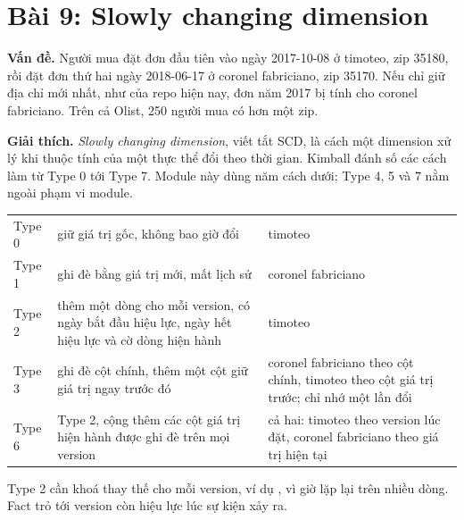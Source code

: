 \section{Bài 9: Slowly changing dimension}

\textbf{Vấn đề.} Người mua  đặt đơn đầu tiên vào ngày 2017-10-08 ở timoteo, zip 35180, rồi đặt đơn thứ hai ngày 2018-06-17 ở coronel fabriciano, zip 35170. Nếu  chỉ giữ địa chỉ mới nhất, như  của repo  hiện nay, đơn năm 2017 bị tính cho coronel fabriciano. Trên cả Olist, 250 người mua có hơn một zip.

\textbf{Giải thích.} \textit{Slowly changing dimension}, viết tắt SCD, là cách một dimension xử lý khi thuộc tính của một thực thể đổi theo thời gian. Kimball đánh số các cách làm từ Type 0 tới Type 7. Module này dùng năm cách dưới; Type 4, 5 và 7 nằm ngoài phạm vi module.

\begin{xltabular}{\textwidth}{@{}P{1.6cm} L P{4.6cm}@{}}
\toprule
{} &  &  \\
\midrule
\endhead
\bottomrule
\endfoot
Type 0 & giữ giá trị gốc, không bao giờ đổi & timoteo \\
Type 1 & ghi đè bằng giá trị mới, mất lịch sử & coronel fabriciano \\
Type 2 & thêm một dòng cho mỗi version, có ngày bắt đầu hiệu lực, ngày hết hiệu lực và cờ dòng hiện hành & timoteo \\
Type 3 & ghi đè cột chính, thêm một cột giữ giá trị ngay trước đó & coronel fabriciano theo cột chính, timoteo theo cột giá trị trước; chỉ nhớ một lần đổi \\
Type 6 & Type 2, cộng thêm các cột giá trị hiện hành được ghi đè trên mọi version & cả hai: timoteo theo version lúc đặt, coronel fabriciano theo giá trị hiện tại \\
\end{xltabular}

Type 2 cần khoá thay thế cho mỗi version, ví dụ , vì  giờ lặp lại trên nhiều dòng. Fact trỏ tới version còn hiệu lực lúc sự kiện xảy ra.

